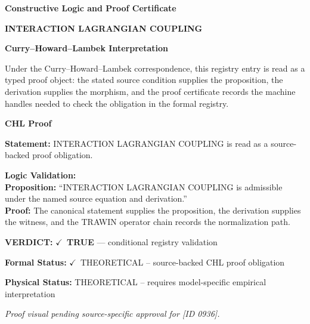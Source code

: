 \clearpage
\begingroup\tzpsupportsetup
\noindent\textbf{\fontsize{10.8pt}{12.8pt}\selectfont [ID 0936] Constructive Logic and Proof Certificate}\par
\noindent\textbf{\fontsize{10pt}{12pt}\selectfont INTERACTION LAGRANGIAN COUPLING}\par
\vspace{0.45em}
\begingroup
\footnotesize
\setlength{\parskip}{0.22em}
\setlength{\parindent}{0pt}
\noindent\textbf{Curry--Howard--Lambek Interpretation}\par
Under the Curry--Howard--Lambek correspondence, this registry entry is read as a typed proof
object: the stated source condition supplies the proposition, the derivation supplies the
morphism, and the proof certificate records the machine handles needed to check the obligation
in the formal registry.

\vspace{0.45em}
\noindent\textbf{CHL Proof}\par
\textbf{Statement:} INTERACTION LAGRANGIAN COUPLING is read as a source-backed proof obligation.

\textbf{Logic Validation:}\\
\textbf{Proposition:} ``INTERACTION LAGRANGIAN COUPLING is admissible under the named source equation and derivation.''\\
\textbf{Proof:} The canonical statement supplies the proposition, the derivation supplies the witness, and the TRAWIN operator chain records the normalization path.

\textbf{VERDICT:} \ensuremath{\checkmark}\ \textbf{TRUE} --- conditional registry validation

\textbf{Formal Status:} \ensuremath{\checkmark}\ THEORETICAL -- source-backed CHL proof obligation

\textbf{Physical Status:} THEORETICAL -- requires model-specific empirical interpretation
\par\vspace{0.45em}
\par
\vfill
\begingroup\footnotesize\itshape
Proof visual pending source-specific approval for [ID 0936].
\par\endgroup
\vfill
\endgroup
\endgroup
